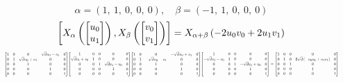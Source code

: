 \documentclass[11pt]{article}
\theoremstyle{definition}
\begin{document}
\[
\alpha = \left( 1, \  1, \  0, \  0, \  0\right), \quad \beta = \left( -1, \  1, \  0, \  0, \  0\right)
\]
\[
\scaletoalign{\textwidth}{\left[ X_{\alpha}\left(\left[\begin{matrix}u_{0}\\u_{1}\end{matrix}\right]\right), X_{\beta}\left(\left[\begin{matrix}v_{0}\\v_{1}\end{matrix}\right]\right) \right] = X_{\alpha + \beta}\left(- 2 u_{0} v_{0} + 2 u_{1} v_{1}\right)}
\]
\[
\scaletoalign{\textwidth}{{\left[\begin{matrix}1 & 0 & 0 & \sqrt{d} u_{0} - u_{1} & 0\\0 & 1 & \sqrt{d} u_{0} + u_{1} & 0 & 0\\0 & 0 & 1 & 0 & 0\\0 & 0 & 0 & 1 & 0\\0 & 0 & 0 & 0 & 1\end{matrix}\right]} {\left[\begin{matrix}1 & 0 & 0 & 0 & 0\\\sqrt{d} v_{1} + v_{0} & 1 & 0 & 0 & 0\\0 & 0 & 1 & \sqrt{d} v_{1} - v_{0} & 0\\0 & 0 & 0 & 1 & 0\\0 & 0 & 0 & 0 & 1\end{matrix}\right]} {\left[\begin{matrix}1 & 0 & 0 & - \sqrt{d} u_{0} + u_{1} & 0\\0 & 1 & - \sqrt{d} u_{0} - u_{1} & 0 & 0\\0 & 0 & 1 & 0 & 0\\0 & 0 & 0 & 1 & 0\\0 & 0 & 0 & 0 & 1\end{matrix}\right]} {\left[\begin{matrix}1 & 0 & 0 & 0 & 0\\- \sqrt{d} v_{1} - v_{0} & 1 & 0 & 0 & 0\\0 & 0 & 1 & - \sqrt{d} v_{1} + v_{0} & 0\\0 & 0 & 0 & 1 & 0\\0 & 0 & 0 & 0 & 1\end{matrix}\right]} = {\left[\begin{matrix}1 & 0 & 0 & 0 & 0\\0 & 1 & 0 & 2 \sqrt{d} \left(- u_{0} v_{0} + u_{1} v_{1}\right) & 0\\0 & 0 & 1 & 0 & 0\\0 & 0 & 0 & 1 & 0\\0 & 0 & 0 & 0 & 1\end{matrix}\right]}}
\]
\end{document}
